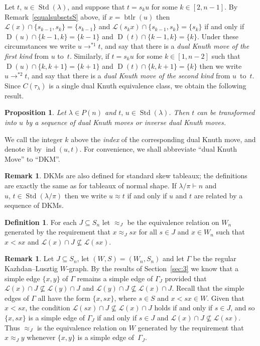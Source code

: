 \documentclass[10pt]{amsart}
\newtheorem{prop}[theo]{Proposition}
\theoremstyle{definition}
\newtheorem{defi}[theo]{Definition}
\newtheorem{rema}[theo]{Remark}
\DeclareMathOperator{\word}{btlr}
\DeclareMathOperator{\STD}{Std}
\DeclareMathOperator{\ind}{ind}
\DeclareMathOperator{\D}{D}
\begin{document}
Let $t,\,u\in\STD(\lambda)$, and suppose that
$t = s_ku$ for some $k\in[2,n-1]$. By Remark~\ref{equalsubsetsS}
above, if $x=\word(u)$ then $\mathcal{L}(x)\cap\{s_{k-1},s_k\}=\{s_{k-1}\}$
and $\mathcal{L}(s_kx)\cap\{s_{k-1},s_k\}=\{s_k\}$ if and only
if $\D(u)\cap\{k-1,k\}=\{k-1\}$ and $\D(t)\cap\{k-1,k\}=\{k\}$.
Under these circumstances we write $u\to^{*1} t$, and say that there
is a \emph{dual Knuth move of the first kind} from $u$ to~$t$.
Similarly, if $t=s_ku$ for some $k\in[1,n-2]$ such that
$\D(u)\cap\{k,k+1\}=\{k+1\}$ and $ \D(t)\cap\{k,k+1\}=\{k\}$ then we
write $u\to^{*2}t$, and say that there is a \emph{dual Knuth
move of the second kind} from $u$~to~$t$.
Since $C(\tau_\lambda)$ is a single dual Knuth equivalence class,
we obtain the following result.

\begin{prop}\label{oneclass}
Let $\lambda\in P(n)$ and $t,\,u\in\STD(\lambda)$. Then $t$
can be transformed into $u$ by a sequence of dual Knuth moves or
inverse dual Knuth moves.
\end{prop}


We call the integer $k$ above the \emph{index} of the corresponding
dual Knuth move, and denote it by $\ind(u,t)$. For convenience, we shall
abbreviate ``dual Knuth Move'' to ``DKM''.

\begin{rema}
DKMs are also defined for standard skew tableaux; the definitions
are exactly the same as for tableaux of normal shape.
If $\lambda/\pi\vdash n$ and $u,\,t\in\STD(\lambda/\pi)$ then we
write $u\approx t$ if and only if $u$ and $t$ are related by a
sequence of DKMs.
\end{rema}
\begin{defi}\label{approxm-in-W}
For each $J\subseteq S_n$ let $\approx_J$ be the
equivalence relation on $W_n$ generated by the requirement that
$x\approx_J sx$ for all $s\in J$ and $x\in W_n$
such that $x<sx$ and $\mathcal L(x)\cap J\nsubseteq\mathcal L(sx)$.
\end{defi}

\begin{rema}\label{restriction-simple-edge}
Let $J\subseteq S_n$, let $(W,S)=(W_n,S_n)$ and let
$\Gamma$ be the regular Kazhdan--Lusztig $W$-graph. By the results of
Section~\ref{sec:3} we know that a simple
edge $\{x,y\}$ of $\Gamma$ remains a simple edge of
$\Gamma_J$ provided that
$\mathcal{L}(x)\cap J\nsubseteq\mathcal{L}(y)\cap J$ and
$\mathcal{L}(y)\cap J\nsubseteq\mathcal{L}(x)\cap J$. Recall that
the simple edges of $\Gamma$ all have the form $\{x,sx\}$, where
$s\in S$ and $x<sx\in W$. Given that $x<sx$, the condition
$\mathcal{L}(sx)\cap J\nsubseteq\mathcal{L}(x)\cap J$ holds if and
only if $s\in J$, and so $\{x,sx\}$ is a simple edge of
$\Gamma_J$ if and only if $s\in J$ and
$\mathcal L(x)\cap J\nsubseteq\mathcal L(sx)$. Thus $\approx_J$
is the equivalence relation on $W$ generated by the requirement
that $x\approx_J y$ whenever $\{x,y\}$ is a simple edge
of~$\Gamma_J$.
\end{rema}
\end{document}
